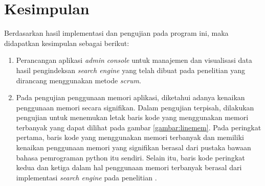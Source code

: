 \documentclass[
	a4paper, %
	10pt, %
	unnumberedsections, %
	twoside, %
]{LTJournalArticle}
\begin{document}
\section{Kesimpulan}
Berdasarkan  hasil  implementasi  dan  pengujian  pada program ini, maka didapatkan kesimpulan sebagai berikut:
\begin{enumerate}
	\item Perancangan aplikasi \textit{admin console} untuk manajemen dan visualisasi data hasil pengindeksan \textit{search engine} yang telah dibuat pada penelitian \cite{lazu} yang dirancang menggunakan metode \textit{scrum}.
	\item Pada pengujian penggunaan memori aplikasi, diketahui adanya kenaikan penggunaan memori secara signifikan. Dalam pengujian terpisah, dilakukan pengujian untuk menemukan letak baris kode yang menggunakan memori terbanyak yang dapat dilihat pada gambar \ref{gambar:linemem}. Pada peringkat pertama, baris kode yang menggunakan memori terbanyak dan memiliki kenaikan penggunaan memori yang signifikan berasal dari pustaka bawaan bahasa pemrograman python itu sendiri. Selain itu, baris kode peringkat kedua dan ketiga dalam hal penggunaan memori terbanyak berasal dari implementasi \textit{search engine} pada penelitian \cite{lazu}. 
\end{enumerate}







\end{document}
